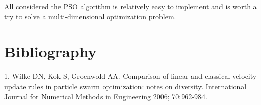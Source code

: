 \documentclass[a4paper,10pt]{article}
\begin{document}
All considered the PSO algorithm is relatively easy to implement and is worth a try to solve a multi-dimensional optimization problem.

\section{Bibliography}
1. Wilke DN, Kok S, Groenwold AA. Comparison of linear and classical velocity update rules in particle swarm optimization: notes on diversity. International Journal for Numerical Methods in Engineering 2006; 70:962-984.
\end{document}
